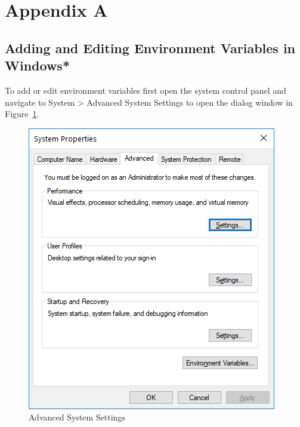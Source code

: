 \documentclass[11pt, twoside, pdftex]{article}
\begin{document}
\newpage
\section{Appendix A}
\label{sec:appendix_a}
\subsection{Adding and Editing Environment Variables in Windows*}
To add or edit environment variables first open the system control panel and navigate to \textsf{System > Advanced System Settings} to open the dialog window in Figure~\ref{fig:advanced_system_settings}.
	\begin{figure} [H]
	\begin{center}
	\includegraphics[scale = 0.7]{figures/fig_advanced_system_settings.PNG}
	\end{center}
	\caption{Advanced System Settings}
	\label{fig:advanced_system_settings}
	\end{figure}
\end{document}
